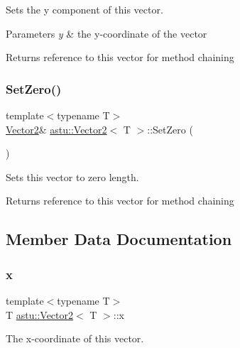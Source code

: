 Sets the y component of this vector.


\begin{DoxyParams}{Parameters}
{\em y} & the y-\/coordinate of the vector \\
\hline
\end{DoxyParams}
\begin{DoxyReturn}{Returns}
reference to this vector for method chaining 
\end{DoxyReturn}
\mbox{\label{classastu_1_1Vector2_a70eb8d4b44d3f973c5065a0ed5f9c01c}} 
\subsubsection{\texorpdfstring{Set\+Zero()}{SetZero()}}
{\footnotesize\ttfamily template$<$typename T$>$ \\
\hyperlink{classastu_1_1Vector2}{Vector2}\& \hyperlink{classastu_1_1Vector2}{astu\+::\+Vector2}$<$ T $>$\+::Set\+Zero (\begin{DoxyParamCaption}{ }\end{DoxyParamCaption})\hspace{0.3cm}{\ttfamily [inline]}}

Sets this vector to zero length.

\begin{DoxyReturn}{Returns}
reference to this vector for method chaining 
\end{DoxyReturn}


\subsection{Member Data Documentation}
\mbox{\label{classastu_1_1Vector2_aa60c30b27742255fbe7053b07a7e76ba}} 
\subsubsection{\texorpdfstring{x}{x}}
{\footnotesize\ttfamily template$<$typename T$>$ \\
T \hyperlink{classastu_1_1Vector2}{astu\+::\+Vector2}$<$ T $>$\+::x}

The x-\/coordinate of this vector. \mbox{\label{classastu_1_1Vector2_a6718f5a7005c38830dbd31283a87f5c9}} 
